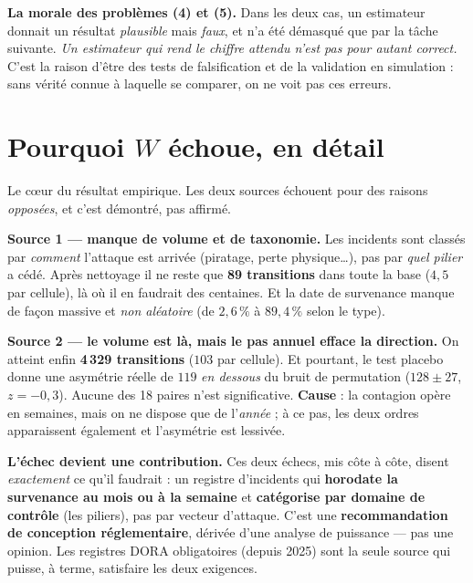 \documentclass[11pt,a4paper]{article}
\begin{document}
\begin{attention}
\textbf{La morale des problèmes (4) et (5).} Dans les deux cas, un estimateur donnait un
résultat \emph{plausible} mais \emph{faux}, et n'a été démasqué que par la tâche suivante.
\emph{Un estimateur qui rend le chiffre attendu n'est pas pour autant correct.} C'est la raison
d'être des tests de falsification et de la validation en simulation : sans vérité connue à
laquelle se comparer, on ne voit pas ces erreurs.
\end{attention}

\section{Pourquoi $W$ échoue, en détail}
\label{sec:donnees}

Le c\oe ur du résultat empirique. Les deux sources échouent pour des raisons \emph{opposées},
et c'est démontré, pas affirmé.

\begin{cle}
\textbf{Source 1 --- manque de volume et de taxonomie.} Les incidents sont classés par
\emph{comment} l'attaque est arrivée (piratage, perte physique\dots), pas par \emph{quel pilier}
a cédé. Après nettoyage il ne reste que \textbf{89 transitions} dans toute la base
($4{,}5$ par cellule), là où il en faudrait des centaines. Et la date de survenance manque de
façon massive et \emph{non aléatoire} (de $2{,}6\,\%$ à $89{,}4\,\%$ selon le type).
\end{cle}

\begin{cle}
\textbf{Source 2 --- le volume est là, mais le pas annuel efface la direction.} On atteint enfin
\textbf{4\,329 transitions} ($103$ par cellule). Et pourtant, le test placebo donne une
asymétrie réelle de $119$ \emph{en dessous} du bruit de permutation ($128\pm 27$, $z=-0{,}3$).
Aucune des 18 paires n'est significative. \textbf{Cause} : la contagion opère en semaines, mais
on ne dispose que de l'\emph{année} ; à ce pas, les deux ordres apparaissent également et
l'asymétrie est lessivée.
\end{cle}

\begin{apport}
\textbf{L'échec devient une contribution.} Ces deux échecs, mis côte à côte, disent
\emph{exactement} ce qu'il faudrait : un registre d'incidents qui \textbf{horodate la survenance
au mois ou à la semaine} et \textbf{catégorise par domaine de contrôle} (les piliers), pas par
vecteur d'attaque. C'est une \textbf{recommandation de conception réglementaire}, dérivée d'une
analyse de puissance --- pas une opinion. Les registres DORA obligatoires (depuis 2025) sont la
seule source qui puisse, à terme, satisfaire les deux exigences.
\end{apport}
\end{document}
